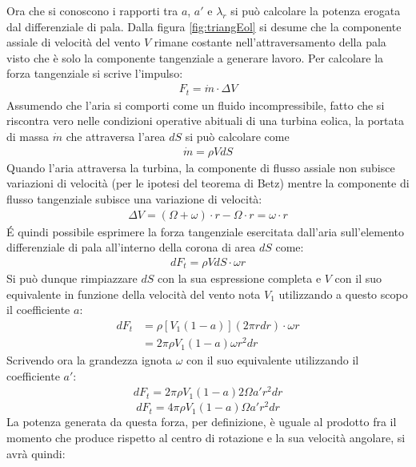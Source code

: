 Ora che si conoscono i rapporti tra $a$, $a'$ e $\lambda_r$ si può calcolare la potenza erogata dal differenziale di pala. Dalla figura \ref{fig:triangEol} si desume che la componente assiale di velocità del vento $V$ rimane costante nell'attraversamento della pala visto che è solo la componente tangenziale a generare lavoro. Per calcolare la forza tangenziale si scrive l'impulso:
\begin{align*}
F_t = \dot{m} \cdot \Delta V
\end{align*}
Assumendo che l'aria si comporti come un fluido incompressibile, fatto che si riscontra vero nelle condizioni operative abituali di una turbina eolica, la portata di massa $\dot{m}$ che attraversa l'area $dS$ si può calcolare come 
\begin{align*}
\dot{m} = \rho V dS
\end{align*}
Quando l'aria attraversa la turbina, la componente di flusso assiale non subisce variazioni di velocità (per le ipotesi del teorema di Betz) mentre la componente di flusso tangenziale subisce una variazione di velocità:
\begin{align*}
\Delta V = \left( \Omega + \omega \right) \cdot r - \Omega \cdot r = \omega \cdot r
\end{align*}
\'E quindi possibile esprimere la forza tangenziale esercitata dall'aria sull'elemento differenziale di pala all'interno della corona di area $dS$ come:
\begin{align*}
dF_t = \rho V dS \cdot \omega r
\end{align*}
Si può dunque rimpiazzare $dS$ con la sua espressione completa e $V$ con il suo equivalente in funzione della velocità del vento nota $V_1$ utilizzando a questo scopo il coefficiente $a$:
\begin{align*}
dF_t &= \rho \left[ V_1 \left(1 -a \right) \right] \left( 2 \pi r dr \right) \cdot \omega r\\
& = 2 \pi \rho V_1 \left( 1-a \right) \omega r^2 dr
\end{align*}
Scrivendo ora la grandezza ignota $\omega$ con il suo equivalente utilizzando il coefficiente $a'$:
\begin{align*}
dF_t = 2 \pi \rho V_1 \left( 1- a \right) 2 \Omega a' r^2 dr
\end{align*}
\begin{equation}\label{eq:dftfin}
dF_t = 4 \pi \rho V_1 \left(1-a \right) \Omega a' r^2 dr
\end{equation}
La potenza generata da questa forza, per definizione, è uguale al prodotto fra il momento che produce rispetto al centro di rotazione e la sua velocità angolare, si avrà quindi:
